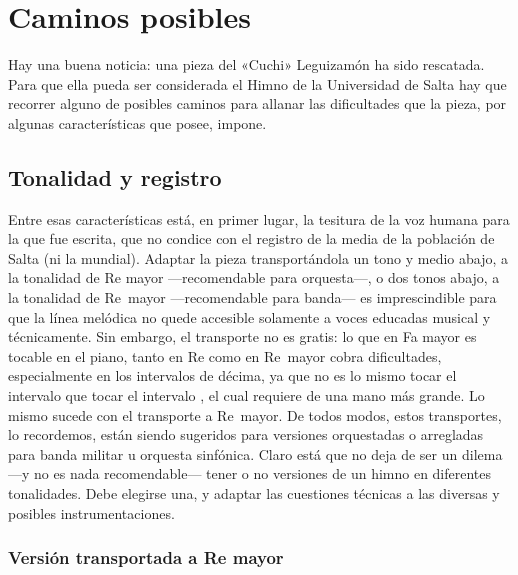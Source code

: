 \chapter{Caminos posibles}
\label{cap:caminos-posibles}

Hay una buena noticia: una pieza del «Cuchi» Leguizamón ha sido rescatada. Para que ella pueda ser considerada el Himno de la Universidad de Salta hay que recorrer alguno de posibles caminos para allanar las dificultades que la pieza, por algunas características que posee, impone.

\section{Tonalidad y registro}
\label{sec:tonalidad-registro}

Entre esas características está, en primer lugar, la tesitura de la voz humana para la que fue escrita, que no condice con el registro de la media de la población de Salta (ni la mundial). Adaptar la pieza transportándola un tono y medio abajo, a la tonalidad de Re mayor ---recomendable para orquesta---, o dos tonos abajo, a la tonalidad de Re\bemoltxt\ mayor ---recomendable para banda--- es imprescindible para que la línea melódica no quede accesible solamente a voces educadas musical y técnicamente. Sin embargo, el transporte no es gratis: lo que en Fa mayor es tocable en el piano, tanto en Re como en Re\bemoltxt\ mayor cobra dificultades, especialmente en los intervalos de décima, ya que no es lo mismo tocar el intervalo  que tocar el intervalo \hbox{,} el cual requiere de una mano más grande. Lo mismo sucede con el transporte a Re\bemoltxt\ mayor. De todos modos, estos transportes, lo recordemos, están siendo sugeridos para versiones orquestadas o arregladas para banda militar u orquesta sinfónica. Claro está que no deja de ser un dilema ---y no es nada recomendable--- tener o no versiones de un himno en diferentes tonalidades. Debe elegirse una, y adaptar las cuestiones técnicas a las diversas y posibles instrumentaciones.

\subsection{Versión transportada a Re mayor}
\label{subsec:transporte-re}


